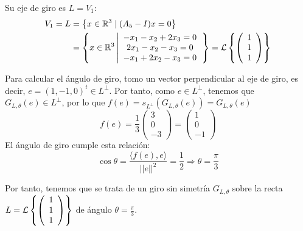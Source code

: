 \begin{ejercicio}
\begin{enumerate}
        Su eje de giro es $L=V_{1}$:
        \begin{equation*}
            \begin{split}
                V_{1}=L& = \left\{x\in \mathbb{R}^3 \mid (A_5-I)x=0\right\}\\
                & = \left\{x\in \mathbb{R}^3 \left|
                \begin{array}{c}
                    -x_1-x_2+2x_3=0 \\
                    2x_1-x_2-x_3=0 \\
                    -x_1+2x_2-x_3=0
                \end{array}
                \right.\right\}
                = \mathcal{L}\left\{\left(\begin{array}{c}
                     1 \\ 1 \\ 1
                \end{array}\right)\right\}
            \end{split}
        \end{equation*}


        Para calcular el ángulo de giro, tomo un vector perpendicular al eje de giro, es decir, $e=(1, -1, 0)^t\in L^\perp$. Por tanto, como $e\in L^\perp$, tenemos que $G_{L,\theta}(e)\in L^\perp$, por lo que $f(e)=s_{L^\perp}(G_{L,\theta}(e))=G_{L,\theta}(e)$
        \begin{equation*}
            f(e)=\frac{1}{3}\left(\begin{array}{c}
                     3 \\ 0 \\ -3
                \end{array}\right) = \left(\begin{array}{c}
                     1 \\ 0 \\ -1
                \end{array}\right)
        \end{equation*}
        El ángulo de giro cumple esta relación:
        \begin{equation*}
            \cos \theta = \frac{\langle f(e),e\rangle}{||e||^2} = \frac{1}{2} \Longrightarrow \theta = \frac{\pi}{3}
        \end{equation*}

        Por tanto, tenemos que se trata de un giro sin simetría $G_{L,\theta}$ sobre la recta $L=\mathcal{L}\left\{\left(\begin{array}{c}
                     1\\ 1 \\ 1
                \end{array}\right)\right\}$ de ángulo $\theta=\frac{\pi}{3}$.




\end{enumerate}
\end{ejercicio}
